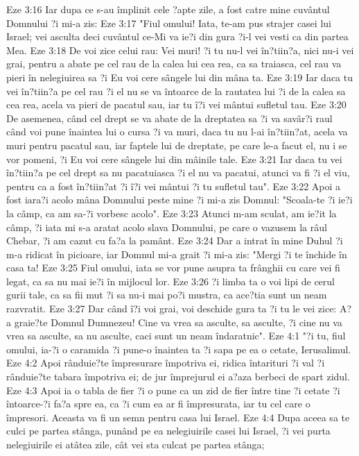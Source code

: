 Eze 3:16  Iar dupa ce s-au împlinit cele ?apte zile, a fost catre mine cuvântul Domnului ?i mi-a zis:
Eze 3:17  "Fiul omului! Iata, te-am pus strajer casei lui Israel; vei asculta deci cuvântul ce-Mi va ie?i din gura ?i-l vei vesti ca din partea Mea.
Eze 3:18  De voi zice celui rau: Vei muri! ?i tu nu-l vei în?tiin?a, nici nu-i vei grai, pentru a abate pe cel rau de la calea lui cea rea, ca sa traiasca, cel rau va pieri în nelegiuirea sa ?i Eu voi cere sângele lui din mâna ta.
Eze 3:19  Iar daca tu vei în?tiin?a pe cel rau ?i el nu se va întoarce de la rautatea lui ?i de la calea sa cea rea, acela va pieri de pacatul sau, iar tu î?i vei mântui sufletul tau.
Eze 3:20  De asemenea, când cel drept se va abate de la dreptatea sa ?i va savâr?i raul când voi pune înaintea lui o cursa ?i va muri, daca tu nu l-ai în?tiin?at, acela va muri pentru pacatul sau, iar faptele lui de dreptate, pe care le-a facut el, nu i se vor pomeni, ?i Eu voi cere sângele lui din mâinile tale.
Eze 3:21  Iar daca tu vei în?tiin?a pe cel drept sa nu pacatuiasca ?i el nu va pacatui, atunci va fi ?i el viu, pentru ca a fost în?tiin?at ?i î?i vei mântui ?i tu sufletul tau".
Eze 3:22  Apoi a fost iara?i acolo mâna Domnului peste mine ?i mi-a zis Domnul: "Scoala-te ?i ie?i la câmp, ca am sa-?i vorbesc acolo".
Eze 3:23  Atunci m-am sculat, am ie?it la câmp, ?i iata mi s-a aratat acolo slava Domnului, pe care o vazusem la râul Chebar, ?i am cazut cu fa?a la pamânt.
Eze 3:24  Dar a intrat în mine Duhul ?i m-a ridicat în picioare, iar Domnul mi-a grait ?i mi-a zis: "Mergi ?i te închide în casa ta!
Eze 3:25  Fiul omului, iata se vor pune asupra ta frânghii cu care vei fi legat, ca sa nu mai ie?i în mijlocul lor.
Eze 3:26  ?i limba ta o voi lipi de cerul gurii tale, ca sa fii mut ?i sa nu-i mai po?i mustra, ca ace?tia sunt un neam razvratit.
Eze 3:27  Dar când î?i voi grai, voi deschide gura ta ?i tu le vei zice: A?a graie?te Domnul Dumnezeu! Cine va vrea sa asculte, sa asculte, ?i cine nu va vrea sa asculte, sa nu asculte, caci sunt un neam îndaratnic".
Eze 4:1  "?i tu, fiul omului, ia-?i o caramida ?i pune-o înaintea ta ?i sapa pe ea o cetate, Ierusalimul.
Eze 4:2  Apoi rânduie?te împresurare împotriva ei, ridica întarituri ?i val ?i rânduie?te tabara împotriva ei; de jur împrejurul ei a?aza berbeci de spart zidul.
Eze 4:3  Apoi ia o tabla de fier ?i o pune ca un zid de fier între tine ?i cetate ?i întoarce-?i fa?a spre ea, ca ?i cum ea ar fi împresurata, iar tu cel care o împresori. Aceasta va fi un semn pentru casa lui Israel.
Eze 4:4  Dupa aceea sa te culci pe partea stânga, punând pe ea nelegiuirile casei lui Israel, ?i vei purta nelegiuirile ei atâtea zile, cât vei sta culcat pe partea stânga;
